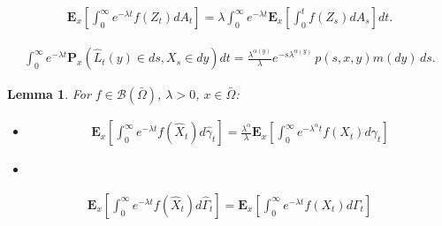\documentclass[10pt,a4paper]{amsart}
\newtheorem{lemma}{Lemma}
\begin{document}
\begin{align}
\label{potintdA}
\mathbf{E}_x \left[ \int_0^\infty e^{-\lambda t} f(Z_t)dA_t \right] = \lambda \int_0^\infty e^{-\lambda t} \mathbf{E}_x\left[ \int_0^t f(Z_s) dA_s \right] dt.
\end{align}

\begin{align}
\label{LapHATp}
\int_0^\infty e^{-\lambda t} \mathbf{P}_x(\hat{L}_t(y) \in ds,  X_s \in dy) dt  =  \frac{\lambda^{\alpha(y)}}{\lambda} e^{-s \lambda^{\alpha(y)}}\, p(s, x,y)m(dy)\, ds.
\end{align}

\begin{lemma}
\label{lemmaequivPCAFhatNOhat}
For $f \in \mathcal{B}(\bar{\Omega})$, $\lambda>0$, $x \in \bar{\Omega}$:
\begin{itemize}
\item[i)]
\begin{align*}
\mathbf{E}_x\left[\int_0^\infty e^{-\lambda t} f(\hat{X}_t) d\hat{\gamma}_t \right] = \frac{\lambda^\alpha}{\lambda} \mathbf{E}_x \left[\int_0^\infty e^{-\lambda^\alpha t} f(X_t) d\gamma_t \right]
\end{align*}
\item[ii)]
\end{itemize} 
\begin{align*}
\mathbf{E}_x\left[\int_0^\infty e^{-\lambda t} f(\hat{X}_t) d\hat{\Gamma}_t \right] = \mathbf{E}_x \left[\int_0^\infty e^{-\lambda t} f(X_t) d\Gamma_t \right]
\end{align*}
\end{lemma}
\end{document}
